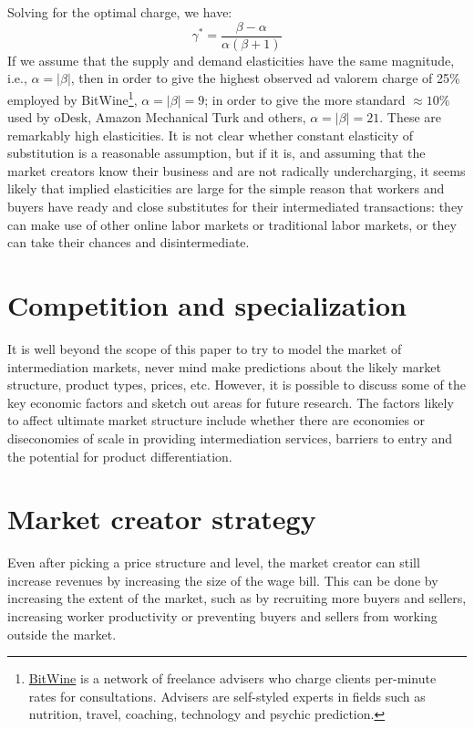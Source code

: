 \documentclass{llncs}
\begin{document}
Solving for the optimal charge, we have: 
\begin{equation}
\gamma^* = \frac{\beta -\alpha }{\alpha  (\beta +1)}
\end{equation} 
If we assume that the supply and demand elasticities have the same
magnitude, i.e., $\alpha = |\beta|$, then in order to give the highest observed ad
valorem charge of 25\% employed by BitWine\footnote{
  \href{http://www.bitwine.com}{BitWine} is a network of freelance
  advisers who charge clients per-minute rates for
  consultations. Advisers are self-styled experts in fields such as
  nutrition, travel, coaching, technology and psychic prediction.},
$\alpha = |\beta| = 9$; in order to give the more standard $\approx
10\%$ used by oDesk, Amazon Mechanical Turk and others, $\alpha =
|\beta| = 21$.  These are remarkably high elasticities. It is not
clear whether constant elasticity of substitution is a reasonable assumption, but if it is, and
assuming that the market creators know their business and are not
radically undercharging, it seems likely that implied elasticities are
large for the simple reason that workers and buyers have ready and
close substitutes for their intermediated transactions: they can make
use of other online labor markets or traditional labor markets, or they
can take their chances and disintermediate.

\section{Competition and specialization} 
It is well beyond the scope of this paper to try to model the market
of intermediation markets, never mind make predictions about the likely
market structure, product types, prices, etc. However, it is possible
to discuss some of the key economic factors and sketch out
areas for future research. The factors likely to affect ultimate
market structure include whether there are economies or diseconomies
of scale in providing intermediation services, barriers to entry and
the potential for product differentiation.

\section{Market creator strategy}
Even after picking a price structure and level, the market creator can
still increase revenues by increasing the size of the wage bill. This can be done by increasing the extent of the market, such as by
recruiting more buyers and sellers, increasing worker productivity or
preventing buyers and sellers from working outside the market.
\end{document}
